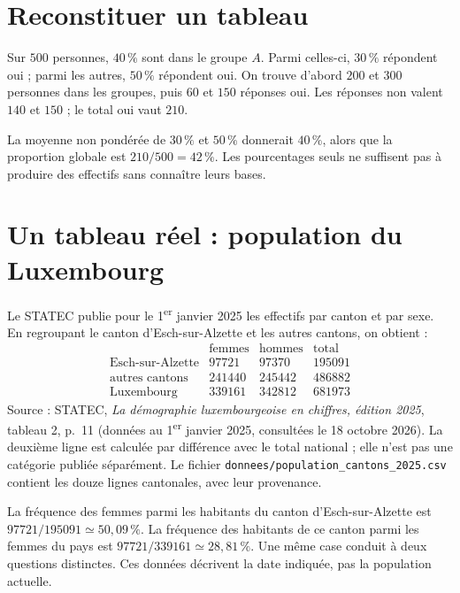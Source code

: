 \documentclass[../cours_2de.tex]{subfiles}
\begin{document}
\section{Reconstituer un tableau}
\begin{exemple}
Sur $500$ personnes, $40\,\%$ sont dans le groupe $A$. Parmi celles-ci, $30\,\%$ répondent oui ; parmi les autres, $50\,\%$ répondent oui.
On trouve d'abord $200$ et $300$ personnes dans les groupes, puis $60$ et $150$ réponses oui.
Les réponses non valent $140$ et $150$ ; le total oui vaut $210$.
\end{exemple}
La moyenne non pondérée de $30\,\%$ et $50\,\%$ donnerait $40\,\%$, alors que la proportion globale est $210/500=42\,\%$.
Les pourcentages seuls ne suffisent pas à produire des effectifs sans connaître leurs bases.
\section{Un tableau réel : population du Luxembourg}
Le STATEC publie pour le 1\textsuperscript{er} janvier 2025 les effectifs par canton et par sexe.
En regroupant le canton d'Esch-sur-Alzette et les autres cantons, on obtient :
\[
\begin{array}{c|rr|r}
 &\text{femmes}&\text{hommes}&\text{total}\\\hline
\text{Esch-sur-Alzette}&97721&97370&195091\\
\text{autres cantons}&241440&245442&486882\\\hline
\text{Luxembourg}&339161&342812&681973
\end{array}
\]
Source : STATEC, \emph{La démographie luxembourgeoise en chiffres, édition 2025}, tableau 2, p.~11 (données au 1\textsuperscript{er} janvier 2025, consultées le 18 octobre 2026).
La deuxième ligne est calculée par différence avec le total national ; elle n'est pas une catégorie publiée séparément.
Le fichier \texttt{donnees/population\_cantons\_2025.csv} contient les douze lignes cantonales, avec leur provenance.
\begin{exemple}
La fréquence des femmes parmi les habitants du canton d'Esch-sur-Alzette est
$97721/195091\simeq50{,}09\,\%$.
La fréquence des habitants de ce canton parmi les femmes du pays est
$97721/339161\simeq28{,}81\,\%$.
Une même case conduit à deux questions distinctes. Ces données décrivent la date indiquée, pas la population actuelle.
\end{exemple}
\end{document}
